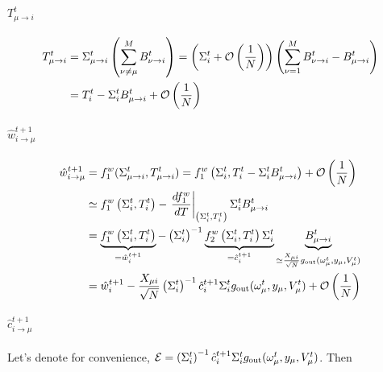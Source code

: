 \documentclass[aip,jmp,amsmath,amssymb,reprint]{revtex4}
\begin{document}
\paragraph{$T_{\mu \to i}^t$}
\begin{align*}
	T_{\mu \to i}^t &= \Sigma_{\mu \to i}^t  \left( \sum\limits_{\nu \ne \mu}^M  B_{\nu \to i}^t \right) 
	= \left( \Sigma_{i  }^t + {\cal O}\left(\frac{1}{N}\right) \right) \left( \sum\limits_{\nu =1}^M  B_{\nu \to i}^t -  B_{\mu \to i}^t \right) \\
	&= T_{i}^t - \Sigma_{i  }^t B_{\mu \to i}^t + {\cal O}\left(\frac{1}{N}\right)
\end{align*}

\paragraph{$\hat{w}_{i\to \mu}^{t+1}$}
\begin{align*}
	\hat{w}_{i\to \mu}^{t+1} &= f_1^w( \Sigma_{\mu \to i}^t , T_{\mu \to i}^t ) = f_1^w\left( \Sigma_{i  }^t  , T_{i}^t - \Sigma_{i  }^t B_{\mu \to i}^t  \right) + {\cal O}\left(\frac{1}{N}\right)\\
	&\simeq f_1^w\left( \Sigma_{i  }^t  , T_{i}^t  \right) -      \left.\frac{d f_1^w}{d T}  \right|_{\left(\Sigma_{i  }^t ,T_{i}^t\right)}\Sigma_{i  }^t B_{\mu \to i}^t \\
	&= \underbrace{f_1^w\left( \Sigma_{i  }^t  , T_{i}^t  \right)}_{=\hat{w}_{i}^{t+1}} - \left(\Sigma_{i  }^t\right)^{-1} \underbrace{f_2^w \left(\Sigma_{i  }^t, T_{i}^t \right) \Sigma_{i  }^t}_{=\hat{c}_{i}^{t+1}} \underbrace{B_{\mu \to i}^t}_{\simeq \frac{X_{\mu i}}{\sqrt{N}} g_{\rm out} (\omega_{\mu}^t, y_{\mu}, V_{\mu}^t)}\\
	&= \hat{w}_{i}^{t+1} - \frac{X_{\mu i}}{\sqrt{N}} \left(\Sigma_{i  }^t\right)^{-1}\hat{c}_{i}^{t+1}\Sigma_{i  }^tg_{\rm out} (\omega_{\mu}^t, y_{\mu}, V_{\mu}^t) + {\cal O}\left( \frac{1}{N} \right)
\end{align*}

\paragraph{$\hat{c}_{i\to \mu}^{t+1}$\\}
Let's denote for convenience, $\mathcal{E} = \left(\Sigma_{i  }^t\right)^{-1}\hat{c}_{i}^{t+1}\Sigma_{i  }^tg_{\rm out} (\omega_{\mu}^t, y_{\mu}, V_{\mu}^t)$. Then
\end{document}
